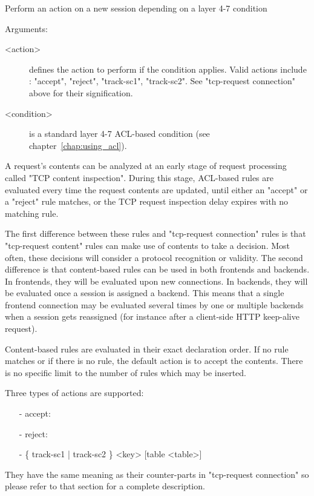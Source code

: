   Perform an action on a new session depending on a layer 4-7 condition


  Arguments:
  \begin{description}
  \item[<action>] defines the action to perform if the condition applies. Valid
                actions include : "accept", "reject", "track-sc1", "track-sc2".
                See "tcp-request connection" above for their signification.

  \item[<condition>] is a standard layer 4-7 ACL-based condition (see chapter~\ref{chap:using_acl}).
  \end{description}

  A request's contents can be analyzed at an early stage of request processing
  called "TCP content inspection". During this stage, ACL-based rules are
  evaluated every time the request contents are updated, until either an
  "accept" or a "reject" rule matches, or the TCP request inspection delay
  expires with no matching rule.

  The first difference between these rules and "tcp-request connection" rules
  is that "tcp-request content" rules can make use of contents to take a
  decision. Most often, these decisions will consider a protocol recognition or
  validity. The second difference is that content-based rules can be used in
  both frontends and backends. In frontends, they will be evaluated upon new
  connections. In backends, they will be evaluated once a session is assigned
  a backend. This means that a single frontend connection may be evaluated
  several times by one or multiple backends when a session gets reassigned
  (for instance after a client-side HTTP keep-alive request).

  Content-based rules are evaluated in their exact declaration order. If no
  rule matches or if there is no rule, the default action is to accept the
  contents. There is no specific limit to the number of rules which may be
  inserted.

  Three types of actions are supported:
  \begin{itemize}
  \item[-] accept:
  \item[-] reject:
  \item[-] \{ track-sc1 | track-sc2 \} <key> [table <table>]
  \end{itemize}

  They have the same meaning as their counter-parts in "tcp-request connection"
  so please refer to that section for a complete description.

